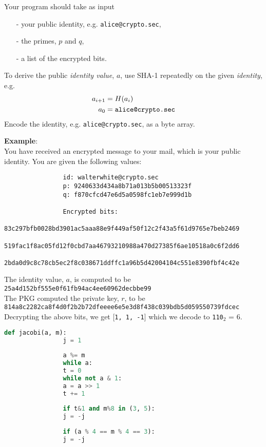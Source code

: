 \documentclass{article}
\begin{document}
\begin{description}
{				Your program should take as input
				\begin{itemize}
					\item[-] your public identity, e.g. \texttt{alice@crypto.sec},
					\item[-] the primes, $p$ and $q$,
					\item[-] a list of the encrypted bits.
				\end{itemize}
				To derive the public \emph{identity value}, $a$, use SHA-1 repeatedly on the given \emph{identity}, e.g.
				\begin{align*}
				a_{i+1} &= H(a_i) \\
				a_0 &= \text{\texttt{alice@crypto.sec}}
				\end{align*}
				Encode the identity, e.g. \texttt{alice@crypto.sec}, as a byte array.
				
				\textbf{Example}:\\
				You have received an encrypted message to your mail, which is your public identity.
				You are given the following values:
				\begin{verbatim}
				id: walterwhite@crypto.sec
				p: 9240633d434a8b71a013b5b00513323f
				q: f870cfcd47e6d5a0598fc1eb7e999d1b
				
				Encrypted bits:
				83c297bfb0028bd3901ac5aaa88e9f449af50f12c2f43a5f61d9765e7beb2469
				519fac1f8ac05fd12f0cbd7aa46793210988a470d27385f6ae10518a0c6f2dd6
				2bda0d9c8c78cb5ec2f8c038671ddffc1a96b5d42004104c551e8390fbf4c42e
				\end{verbatim}
				The identity value, $a$, is computed to be\\
				\texttt{25a4d152bf555e0f61fb94ac4ee60962decbbe99}\\
				The PKG computed the private key, $r$, to be\\
				\texttt{814a8c2282ca8f4d0f2b2b72dfeeee6e5e3d8f438c039bdb5d059550739fdcec}\\
				Decrypting the above bits, we get [\texttt{1, 1, -1}] which we decode to \texttt{110}$_2$ = $6$.
				\begin{lstlisting}[float=htb, style=customc, language=python, caption={The Jacobi symbol in Python.}, label={lst:jacobi}]
				def jacobi(a, m):
				j = 1
				
				a %= m
				while a:
				t = 0
				while not a & 1:
				a = a >> 1
				t += 1
				
				if t&1 and m%8 in (3, 5):
				j = -j
				
				if (a % 4 == m % 4 == 3):
				j = -j
				

\end{lstlisting}}
\end{description}
\end{document}
